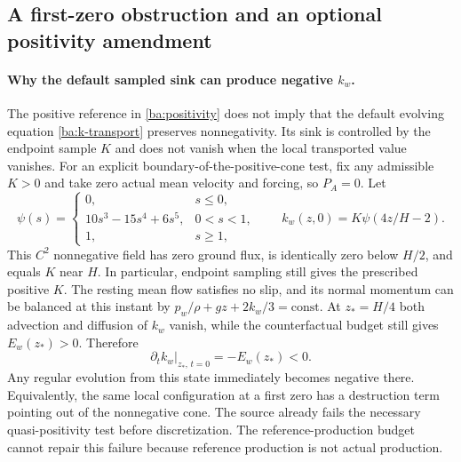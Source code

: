 \documentclass[11pt,a4paper]{article}
\numberwithin{equation}{section}
\begin{document}
\subsection{A first-zero obstruction and an optional positivity amendment}
\label{ba:dynamic-positivity}

\paragraph{Why the default sampled sink can produce negative $k_w$.}
The positive reference in \eqref{ba:positivity} does not imply that
the default evolving equation \eqref{ba:k-transport} preserves
nonnegativity. Its sink is controlled by the endpoint sample $K$ and
does not vanish when the local transported value vanishes.
For an explicit boundary-of-the-positive-cone test, fix any admissible
$K>0$ and take zero actual mean velocity and forcing, so $P_A=0$.
Let
\begin{equation}
 \psi(s)=
 \begin{cases}
 0,&s\leq0,\\
 10s^3-15s^4+6s^5,&0<s<1,\\
 1,&s\geq1,
 \end{cases}
 \qquad k_w(z,0)=K\psi(4z/H-2).
 \label{ba:first-zero-data}
\end{equation}
This $C^2$ nonnegative field has zero ground flux, is identically zero
below $H/2$, and equals $K$ near $H$. In particular, endpoint sampling
still gives the prescribed positive $K$. The resting mean flow satisfies
no slip, and its normal momentum can be balanced at this instant by
$p_w/\rho+gz+2k_w/3=\mathrm{const}$.
At $z_*=H/4$ both advection
and diffusion of $k_w$ vanish, while the counterfactual budget still
gives $E_w(z_*)>0$. Therefore
\begin{equation}
 \left.\partial_t k_w\right|_{z_*,\,t=0}
 =-E_w(z_*)<0.
 \label{ba:first-zero-failure}
\end{equation}
Any regular evolution from this state immediately becomes negative
there. Equivalently, the same local configuration at a first zero has
a destruction term pointing out of the nonnegative cone. The source
already fails the necessary quasi-positivity test before discretization.
The reference-production budget cannot repair this failure because
reference production is not actual production.
\end{document}
